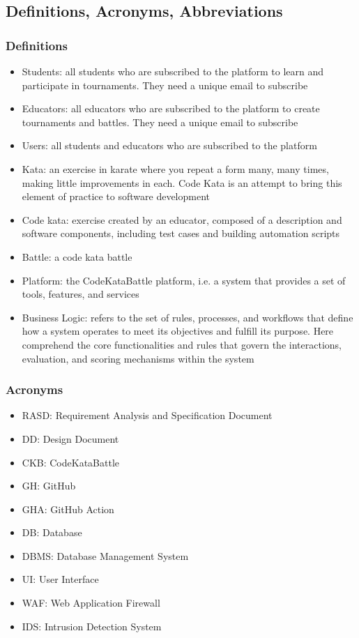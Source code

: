 \subsection{Definitions, Acronyms, Abbreviations}
\subsubsection{Definitions}
\begin{itemize}
    \item Students: all students who are subscribed to the platform to learn and participate in tournaments. They need a unique email to subscribe
    \item Educators: all educators who are subscribed to the platform to create tournaments and battles. They need a unique email to subscribe
    \item Users: all students and educators who are subscribed to the platform
    \item Kata: an exercise in karate where you repeat a form many, many times, making little improvements in each. Code Kata is an attempt to bring this element of practice to software development
    \item Code kata: exercise created by an educator, composed of a description and software components, including test cases and building automation scripts
    \item Battle: a code kata battle
    \item Platform: the CodeKataBattle platform, i.e. a system that provides a set of tools, features, and services
    \item Business Logic: refers to the set of rules, processes, and workflows that define how a system operates to meet its objectives and fulfill its purpose. Here comprehend the core functionalities and rules that govern the interactions, evaluation, and scoring mechanisms within the system
\end{itemize}

\subsubsection{Acronyms}
\begin{itemize}
    \item RASD: Requirement Analysis and Specification Document
    \item DD: Design Document
    \item CKB: CodeKataBattle
    \item GH: GitHub
    \item GHA: GitHub Action
    \item DB: Database
    \item DBMS: Database Management System
    \item UI: User Interface
    \item WAF: Web Application Firewall
    \item IDS: Intrusion Detection System
\end{itemize}

